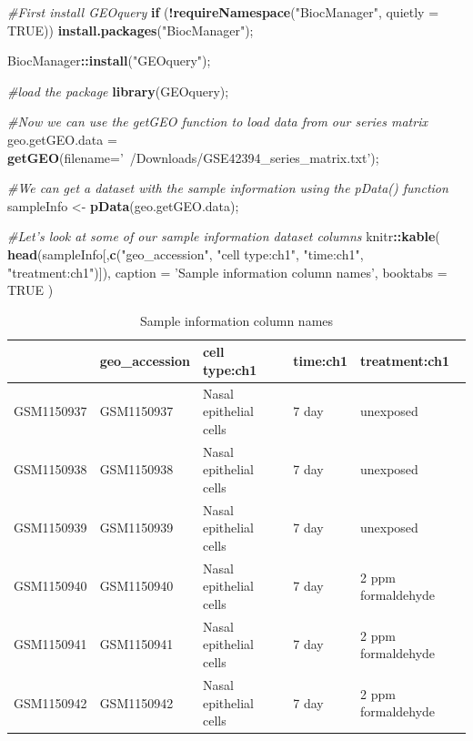 \documentclass[
]{book}
\newenvironment{Shaded}{\begin{snugshade}}{\end{snugshade}}
\newcommand{\CommentTok}[1]{\textcolor[rgb]{0.56,0.35,0.01}{\textit{#1}}}
\newcommand{\ControlFlowTok}[1]{\textcolor[rgb]{0.13,0.29,0.53}{\textbf{#1}}}
\newcommand{\DataTypeTok}[1]{\textcolor[rgb]{0.13,0.29,0.53}{#1}}
\newcommand{\KeywordTok}[1]{\textcolor[rgb]{0.13,0.29,0.53}{\textbf{#1}}}
\newcommand{\NormalTok}[1]{#1}
\newcommand{\OperatorTok}[1]{\textcolor[rgb]{0.81,0.36,0.00}{\textbf{#1}}}
\newcommand{\OtherTok}[1]{\textcolor[rgb]{0.56,0.35,0.01}{#1}}
\newcommand{\StringTok}[1]{\textcolor[rgb]{0.31,0.60,0.02}{#1}}
\begin{document}
\begin{Shaded}
\begin{Highlighting}[]
\CommentTok{#First install GEOquery}
\ControlFlowTok{if}\NormalTok{ (}\OperatorTok{!}\KeywordTok{requireNamespace}\NormalTok{(}\StringTok{"BiocManager"}\NormalTok{, }\DataTypeTok{quietly =} \OtherTok{TRUE}\NormalTok{))}
    \KeywordTok{install.packages}\NormalTok{(}\StringTok{"BiocManager"}\NormalTok{);}

\NormalTok{BiocManager}\OperatorTok{::}\KeywordTok{install}\NormalTok{(}\StringTok{"GEOquery"}\NormalTok{);}

\CommentTok{#load the package}
\KeywordTok{library}\NormalTok{(GEOquery);}

\CommentTok{#Now we can use the getGEO function to load data from our series matrix}
\NormalTok{geo.getGEO.data =}\StringTok{ }\KeywordTok{getGEO}\NormalTok{(}\DataTypeTok{filename=}\StringTok{'~/Downloads/GSE42394_series_matrix.txt'}\NormalTok{);}

\CommentTok{#We can get a dataset with the sample information using the pData() function}
\NormalTok{sampleInfo <-}\StringTok{ }\KeywordTok{pData}\NormalTok{(geo.getGEO.data);}

\CommentTok{#Let's look at some of our sample information dataset columns}
\NormalTok{knitr}\OperatorTok{::}\KeywordTok{kable}\NormalTok{(}
  \KeywordTok{head}\NormalTok{(sampleInfo[,}\KeywordTok{c}\NormalTok{(}\StringTok{"geo_accession"}\NormalTok{, }\StringTok{"cell type:ch1"}\NormalTok{, }\StringTok{"time:ch1"}\NormalTok{,}
                     \StringTok{"treatment:ch1"}\NormalTok{)]), }\DataTypeTok{caption =} \StringTok{'Sample information column names'}\NormalTok{,}
  \DataTypeTok{booktabs =} \OtherTok{TRUE}
\NormalTok{)}
\end{Highlighting}
\end{Shaded}

\begin{table}

\caption{\label{tab:load2}Sample information column names}
\centering
\begin{tabular}[t]{lllll}
\toprule
  & geo\_accession & cell type:ch1 & time:ch1 & treatment:ch1\\
\midrule
GSM1150937 & GSM1150937 & Nasal epithelial cells & 7 day & unexposed\\
GSM1150938 & GSM1150938 & Nasal epithelial cells & 7 day & unexposed\\
GSM1150939 & GSM1150939 & Nasal epithelial cells & 7 day & unexposed\\
GSM1150940 & GSM1150940 & Nasal epithelial cells & 7 day & 2 ppm formaldehyde\\
GSM1150941 & GSM1150941 & Nasal epithelial cells & 7 day & 2 ppm formaldehyde\\
\addlinespace
GSM1150942 & GSM1150942 & Nasal epithelial cells & 7 day & 2 ppm formaldehyde\\
\bottomrule
\end{tabular}
\end{table}
\end{document}
